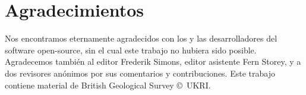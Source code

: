 
\section{Agradecimientos}

Nos encontramos eternamente agradecidos con los y las desarrolladores del
software open-source, sin el cual este trabajo no hubiera sido posible.
Agradecemos también al editor Frederik Simons, editor asistente Fern Storey,
y a dos revisores anónimos por sus comentarios y contribuciones.
Este trabajo contiene material de British Geological Survey ©~UKRI.
